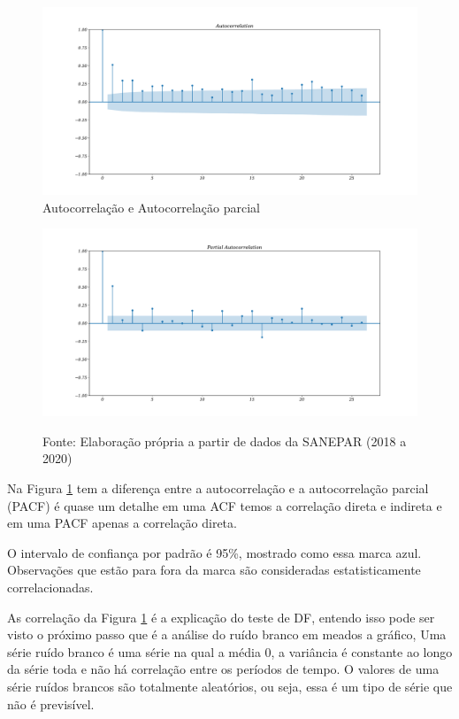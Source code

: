 \begin{figure}[H]
	\centering
		\caption{Autocorrelação e Autocorrelação parcial}
	\label{fig:acf}
	\includegraphics[width=0.8\linewidth]{Resultados/Figuras/acf} 
	
\end{figure}	
\begin{figure}[H]
	\centering
		\includegraphics[width=0.8\linewidth]{Resultados/Figuras/pacf}

	Fonte: Elaboração própria a partir de dados da SANEPAR (2018 a 2020)
\end{figure}


Na Figura \ref{fig:acf} tem a diferença entre a autocorrelação e a autocorrelação parcial (PACF) é quase um detalhe em uma ACF temos a correlação direta e indireta e em uma PACF apenas a correlação direta. 

O intervalo de confiança por padrão é 95\%, mostrado como essa marca azul. Observações que estão para fora da marca são consideradas estatisticamente correlacionadas.

As correlação da Figura \ref{fig:acf} é a explicação do teste de DF, entendo isso pode ser visto o próximo passo que é  a análise do ruído branco em meados a gráfico, Uma série ruído branco é uma série na qual a média 0, a variância é constante ao longo da série toda e não há correlação entre os períodos de tempo. O valores de uma série ruídos brancos são totalmente aleatórios, ou seja, essa é um tipo de série que não é previsível.

